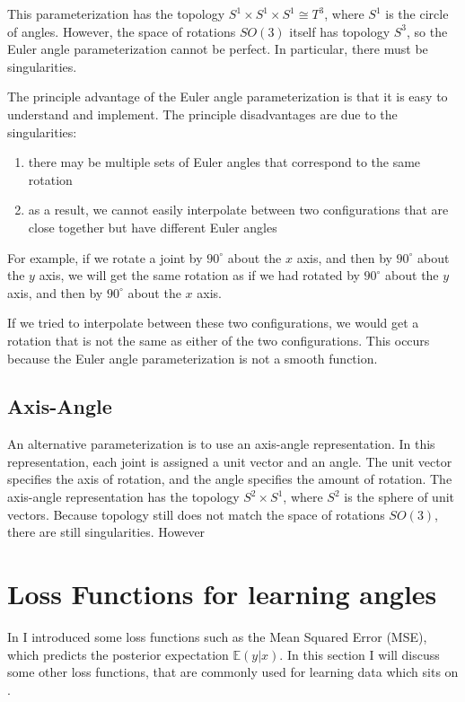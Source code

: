 This parameterization has the topology $S^1 \times S^1 \times S^1 ≅ T^3$, where $S^1$ is the circle of angles. However, the space of rotations $SO(3)$ itself has topology $S^3$, so the Euler angle parameterization cannot be perfect. In particular, there must be singularities.

The principle advantage of the Euler angle parameterization is that it is easy to understand and implement. The principle disadvantages are due to the singularities:
\begin{enumerate}
    \item there may be multiple sets of Euler angles that correspond to the same rotation
    \item as a result, we cannot easily interpolate between two configurations that are close together but have different Euler angles
\end{enumerate}

For example, if we rotate a joint by $90^\circ$ about the $x$ axis, and then by $90^\circ$ about the $y$ axis, we will get the same rotation as if we had rotated by $90^\circ$ about the $y$ axis, and then by $90^\circ$ about the $x$ axis. 

If we tried to interpolate between these two configurations, we would get a rotation that is not the same as either of the two configurations. This occurs because the Euler angle parameterization is not a smooth function.

\subsection{Axis-Angle}

An alternative parameterization is to use an axis-angle representation. In this representation, each joint is assigned a unit vector and an angle. The unit vector specifies the axis of rotation, and the angle specifies the amount of rotation. The axis-angle representation has the topology $S^2 \times S^1$, where $S^2$ is the sphere of unit vectors. Because topology still does not match the space of rotations $SO(3)$, there are still singularities. However




\section{Loss Functions for learning angles}

In  I introduced some loss functions such as the Mean Squared Error (MSE), which predicts the posterior expectation $\mathbb{E}(y | x)$. In this section I will discuss some other loss functions, that are commonly used for learning data which sits on .

